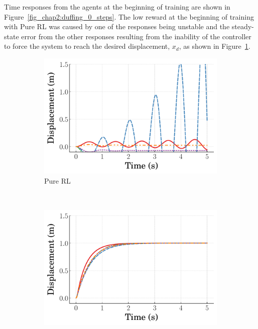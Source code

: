 Time responses from the agents at the beginning of training are shown in Figure~\ref{fig_chap2:duffing_0_steps}.
%
The low reward at the beginning of training with Pure RL was caused by one of the responses being unstable and the steady-state error from the other responses resulting from the inability of the controller to force the system to reach the desired displacement, $x_d$, as shown in Figure~\ref{subfig_chap2:duffing_pure_RL_0_steps}.
%
\begin{figure}[tb]
    \centering
    \begin{subfigure}[b]{0.49\textwidth}
        \centering
        \includegraphics[width=\textwidth]{figures/figures_RL_model_based_control/time_responses_duffing/duffing_pure_RL/Displacement_1_init_0_steps.pdf}
        \caption{Pure RL}
        \label{subfig_chap2:duffing_pure_RL_0_steps}
    \end{subfigure}\\
    \hfill
    \begin{subfigure}[b]{0.49\textwidth}
        \centering
        \includegraphics[width=\textwidth]{figures/figures_RL_model_based_control/time_responses_duffing/duffing_RL_PD/Displacement_1_init_0_steps.pdf}

\end{subfigure}
\end{figure}
